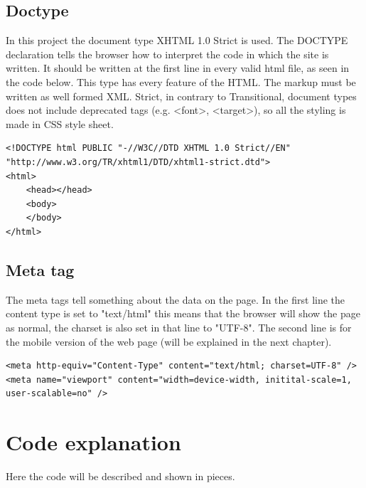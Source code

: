 \subsection{Doctype}
In this project the document type XHTML 1.0 Strict is used. The DOCTYPE declaration tells the browser how to interpret the code in which the site is written. It should be written at the first line in every valid html file, as seen in the code below. This type has every feature of the HTML. The markup must be written as well formed XML. Strict, in contrary to Transitional, document types does not include deprecated tags (e.g. \textless font\textgreater , \textless target\textgreater), so all the styling is made in CSS style sheet.
\begin{lstlisting}
<!DOCTYPE html PUBLIC "-//W3C//DTD XHTML 1.0 Strict//EN" "http://www.w3.org/TR/xhtml1/DTD/xhtml1-strict.dtd">
<html>
	<head></head>
	<body>
	</body>
</html>
\end{lstlisting}

\subsection{Meta tag}
The meta tags tell something about the data on the page. In the first line the content type is set to "text/html" this means that the browser will show the page as normal, the charset is also set in that line to "UTF-8". The second line is for the mobile version of the web page (will be explained in the next chapter).
\begin{lstlisting}
<meta http-equiv="Content-Type" content="text/html; charset=UTF-8" />
<meta name="viewport" content="width=device-width, initital-scale=1, user-scalable=no" />
\end{lstlisting}

\section{Code explanation}
Here the code will be described and shown in pieces.
